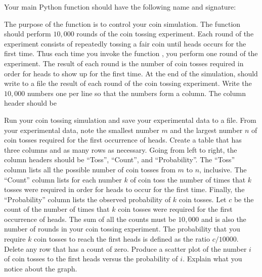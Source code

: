 \documentclass[a4paper,oneside,12pt]{article}
\begin{document}
\begin{problem}
\begin{packedenum}
  \item\label{subprob:exponential:coin_simulation_main}
    Your main Python function should have the following name and
    signature:
    \begin{center}
    \end{center}
    The purpose of the function  is to control your coin
    simulation.  The function should perform $10,000$ rounds of the
    coin tossing experiment.  Each round of the experiment consists of
    repeatedly tossing a fair coin until heads occurs for the first
    time.  Thus each time you invoke the function
    , you perform one round of the
    experiment.  The result of each round is the number of coin tosses
    required in order for heads to show up for the first time.  At the
    end of the simulation,  should write to a file the
    result of each round of the coin tossing experiment.  Write the
    $10,000$ numbers one per line so that the numbers form a column.
    The column header should be
    \begin{center}
    \end{center}

  \item\label{subprob:exponential:coin_simulation_frequency_distribution}
    Run your coin tossing simulation and save your experimental data
    to a file.  From your experimental data, note the smallest number
    $m$ and the largest number $n$ of coin tosses required for the
    first occurrence of heads.  Create a table that has three columns
    and as many rows as necessary.  Going from left to right, the
    column headers should be ``Toss'', ``Count'', and
    ``Probability''.  The ``Toss'' column lists all the possible
    number of coin tosses from $m$ to $n$, inclusive.  The ``Count''
    column lists for each number $k$ of coin toss the number of times
    that $k$ tosses were required in order for heads to occur for the
    first time.  Finally, the ``Probability'' column lists the
    observed probability of $k$ coin tosses.  Let $c$ be the count of
    the number of times that $k$ coin tosses were required for the
    first occurrence of heads.  The sum of all the counts must be
    $10,000$ and is also the number of rounds in your coin tossing
    experiment.  The probability that you require $k$ coin tosses to
    reach the first heads is defined as the ratio $c / 10000$.  Delete
    any row that has a count of zero.  Produce a scatter plot of the
    number $i$ of coin tosses to the first heads versus the
    probability of $i$.  Explain what you notice about the graph.


\end{packedenum}
\end{problem}
\end{document}
